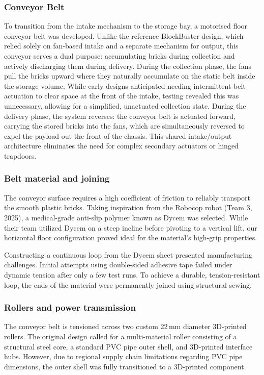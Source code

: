 \documentclass[11pt]{article}
\begin{document}
\subsubsection{Conveyor Belt}
To transition from the intake mechanism to the storage bay, a motorised floor conveyor belt was developed. Unlike the reference BlockBuster design, which relied solely on fan-based intake and a separate mechanism for output, this conveyor serves a dual purpose: accumulating bricks during collection and actively discharging them during delivery. During the collection phase, the fans pull the bricks upward where they naturally accumulate on the static belt inside the storage volume. While early designs anticipated needing intermittent belt actuation to clear space at the front of the intake, testing revealed this was unnecessary, allowing for a simplified, unactuated collection state. During the delivery phase, the system reverses: the conveyor belt is actuated forward, carrying the stored bricks into the fans, which are simultaneously reversed to expel the payload out the front of the chassis. This shared intake/output architecture eliminates the need for complex secondary actuators or hinged trapdoors.

\subsubsection{Belt material and joining}
The conveyor surface requires a high coefficient of friction to reliably transport the smooth plastic bricks. Taking inspiration from the Robocop robot (Team 3, 2025), a medical-grade anti-slip polymer known as Dycem was selected. While their team utilized Dycem on a steep incline before pivoting to a vertical lift, our horizontal floor configuration proved ideal for the material's high-grip properties. 

Constructing a continuous loop from the Dycem sheet presented manufacturing challenges. Initial attempts using double-sided adhesive tape failed under dynamic tension after only a few test runs. To achieve a durable, tension-resistant loop, the ends of the material were permanently joined using structural sewing. 

\subsubsection{Rollers and power transmission}
The conveyor belt is tensioned across two custom 22\,mm diameter 3D-printed rollers. The original design called for a multi-material roller consisting of a structural steel core, a standard PVC pipe outer shell, and 3D-printed interface hubs. However, due to regional supply chain limitations regarding PVC pipe dimensions, the outer shell was fully transitioned to a 3D-printed component. 
\end{document}
